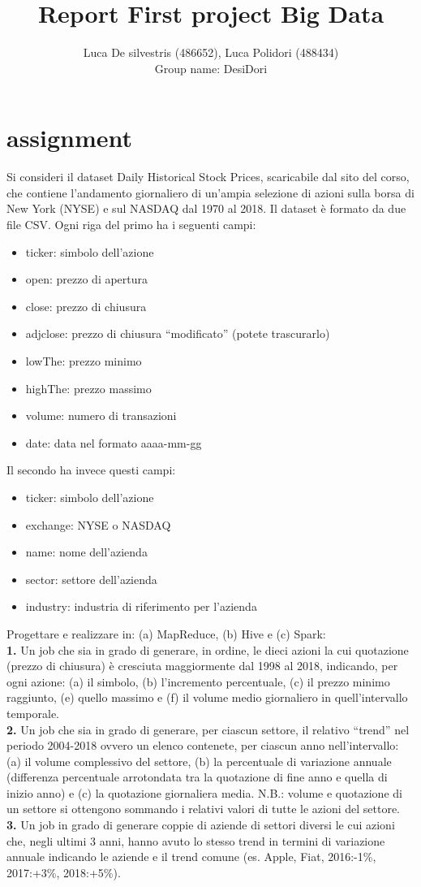 \documentclass[]{report}
\title{Report First project Big Data}
\author{Luca De silvestris (486652), Luca Polidori (488434)\\ Group name: DesiDori}
\begin{document}
\maketitle

\chapter*{assignment}
Si consideri il dataset Daily Historical Stock Prices, scaricabile dal sito del corso, che contiene l’andamento giornaliero
di un’ampia selezione di azioni sulla borsa di New York (NYSE) e sul NASDAQ dal 1970 al 2018. Il dataset è formato da
due file CSV. Ogni riga del primo ha i seguenti campi:
\begin{itemize}
	\item ticker: simbolo dell’azione
	\item open: prezzo di apertura
	\item close: prezzo di chiusura
	\item adjclose: prezzo di chiusura “modificato” (potete trascurarlo)
	\item lowThe: prezzo minimo
	\item highThe: prezzo massimo
	\item volume: numero di transazioni
	\item date: data nel formato aaaa-mm-gg
\end{itemize}

Il secondo ha invece questi campi:
\begin{itemize}
	\item ticker: simbolo dell’azione
	\item exchange: NYSE o NASDAQ
	\item name: nome dell’azienda
	\item sector: settore dell’azienda
	\item industry: industria di riferimento per l’azienda
\end{itemize}

Progettare e realizzare in: (a) MapReduce, (b) Hive e (c) Spark:\\
\textbf{1.} Un job che sia in grado di generare, in ordine, le dieci azioni la cui quotazione (prezzo di chiusura) è cresciuta
maggiormente dal 1998 al 2018, indicando, per ogni azione: (a) il simbolo, (b) l’incremento percentuale, (c) il
prezzo minimo raggiunto, (e) quello massimo e (f) il volume medio giornaliero in quell’intervallo temporale.\\
\textbf{2.} Un job che sia in grado di generare, per ciascun settore, il relativo “trend” nel periodo 2004-2018 ovvero un
elenco contenete, per ciascun anno nell’intervallo: (a) il volume complessivo del settore, (b) la percentuale di
variazione annuale (differenza percentuale arrotondata tra la quotazione di fine anno e quella di inizio anno)
e (c) la quotazione giornaliera media. N.B.: volume e quotazione di un settore si ottengono sommando i
relativi valori di tutte le azioni del settore.\\
\textbf{3. }Un job in grado di generare coppie di aziende di settori diversi le cui azioni che, negli ultimi 3 anni, hanno
avuto lo stesso trend in termini di variazione annuale indicando le aziende e il trend comune (es. Apple, Fiat,
2016:-1\%, 2017:+3\%, 2018:+5\%).
\end{document}
